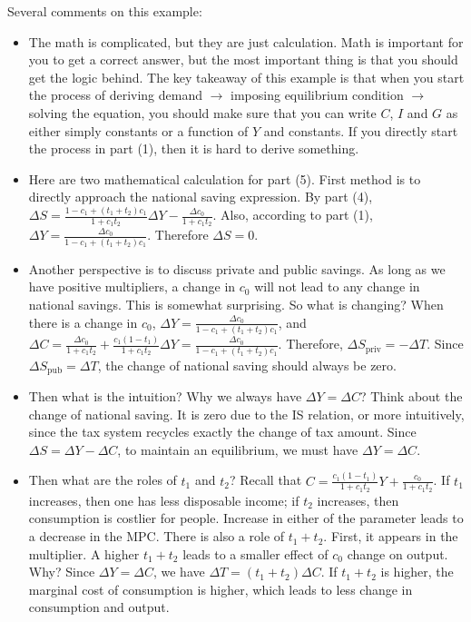 \documentclass[12pt]{article}
\begin{document}
Several comments on this example:
\begin{itemize}
    \item The math is complicated, but they are just calculation. Math is important for you to get a correct answer, but the most important thing is that you should get the logic behind. The key takeaway of this example is that when you start the process of deriving demand $\rightarrow$ imposing equilibrium condition $\rightarrow$ solving the equation, you should make sure that you can write $C$, $I$ and $G$ as either simply constants or a function of $Y$ and constants. If you directly start the process in part (1), then it is hard to derive something. 
    \item Here are two mathematical calculation for part (5). First method is to directly approach the national saving expression. By part (4), $\Delta S = \frac{1 - c_1 + (t_1 + t_2)c_1}{1+c_1t_2} \Delta Y - \frac{\Delta c_0}{1+c_1t_2}$. Also, according to part (1), $\Delta Y = \frac{\Delta c_0}{1 - c_1 + (t_1 + t_2)c_1}$. Therefore $\Delta S = 0$.
    \item Another perspective is to discuss private and public savings. As long as we have positive multipliers, a change in $c_0$ will not lead to any change in national savings. This is somewhat surprising. So what is changing? When there is a change in $c_0$, $\Delta Y = \frac{\Delta c_0}{1-c_1 + (t_1+t_2)c_1}$, and $\Delta C = \frac{\Delta c_0}{1+c_1t_2} + \frac{c_1(1-t_1)}{1+c_1t_2}\Delta Y = \frac{\Delta c_0}{1-c_1 + (t_1+t_2)c_1}$. Therefore, $\Delta S_{\text{priv}} = -\Delta T$. Since $\Delta S_{\text{pub}} = \Delta T$, the change of national saving should always be zero. 
    \item Then what is the intuition? Why we always have $\Delta Y = \Delta C$? Think about the change of national saving. It is zero due to the IS relation, or more intuitively, since the tax system recycles exactly the change of tax amount. Since $\Delta S = \Delta Y - \Delta C$, to maintain an equilibrium, we must have $\Delta Y = \Delta C$.
    \item Then what are the roles of $t_1$ and $t_2$? Recall that \(C = \frac{c_1(1-t_1)}{1+c_1t_2}Y + \frac{c_0}{1+c_1t_2}\). If $t_1$ increases, then one has less disposable income; if $t_2$ increases, then consumption is costlier for people. Increase in either of the parameter leads to a decrease in the MPC. There is also a role of $t_1+t_2$. First, it appears in the multiplier. A higher $t_1+t_2$ leads to a smaller effect of $c_0$ change on output. Why? Since $\Delta Y = \Delta C$, we have $\Delta T = (t_1+t_2)\Delta C$. If $t_1+t_2$ is higher, the marginal cost of consumption is higher, which leads to less change in consumption and output.
\end{itemize}
\end{document}

